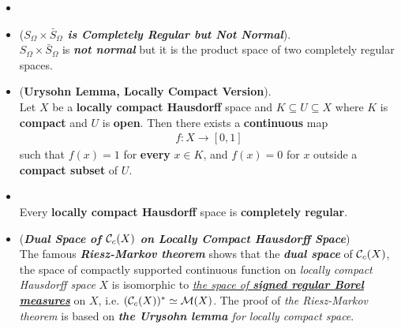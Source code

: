 \documentclass[11pt]{article}
\begin{document}
\begin{itemize}
\item {}

\item \begin{example} (\emph{\textbf{$S_{\Omega}\times \bar{S}_{\Omega}$ is Completely Regular but Not Normal}}).\\
$S_{\Omega}\times \bar{S}_{\Omega}$ is \emph{\textbf{not normal}} but it is the product space of two completely regular spaces.
\end{example}

\item \begin{theorem}  (\textbf{Urysohn Lemma, Locally Compact Version}). \citep{folland2013real}\\ 
Let $X$ be a \textbf{locally compact Hausdorff} space and $K \subseteq U \subseteq X$ where $K$ is \textbf{compact} and $U$ is \textbf{open}.  Then there exists a \textbf{continuous} map
\begin{align*}
f : X \rightarrow [0, 1]
\end{align*}
such that $f(x) = 1$ for \textbf{every} $x \in K$, and $f(x) = 0$ for $x$ outside a \textbf{compact subset} of $U$.
\end{theorem}

\item \begin{corollary}\citep{folland2013real}\\ 
Every \textbf{locally compact Hausdorff} space is \textbf{completely regular}.
\end{corollary}


\item \begin{remark} (\emph{\textbf{Dual Space of ${\mathcal C}_{c}(X)$ on Locally Compact Hausdorff Space}}) \citep{reed1980methods, folland2013real} \\
The famous \emph{\textbf{Riesz-Markov theorem}} shows that  the \emph{\textbf{dual space}} of ${\mathcal C}_{c}(X)$, the space of compactly supported continuous function on \emph{locally compact Hausdorff space} $X$ is isomorphic to \underline{\emph{the space of \textbf{signed regular Borel measures}}} on $X$, i.e. $({\mathcal C}_c(X))^{*} \simeq {\mathcal M}(X)$. The proof of \emph{the Riesz-Markov theorem} is based on \emph{\textbf{the Urysohn lemma} for locally compact space}.
\end{remark}
\end{itemize}
\end{document}
